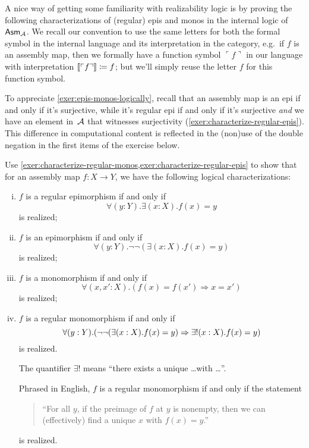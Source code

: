 A nice way of getting some familiarity with realizability logic is by proving
the following characterizations of (regular) epis and monos in the internal
logic of \(\Asm{\AA}\).
%
We recall our convention to use the same letters for both the formal symbol in
the internal language and its interpretation in the category, e.g.\ if \(f\) is
an assembly map, then we formally have a function symbol
\(\ulcorner f \urcorner\) in our language with interpretation
\(\sem{\ulcorner f \urcorner} \coloneqq f\); but we'll simply reuse the letter
\(f\) for this function symbol.

To appreciate \cref{exer:epis-monos-logically}, recall that an assembly map is
an epi if and only if it's surjective, while it's regular epi if and only if
it's surjective \emph{and} we have an element in~\(\AA\) that witnesses
surjectivity (\cref{exer:characterize-regular-epis}).
%
This difference in computational content is reflected in the (non)use of the
double negation in the first items of the exercise below.

\begin{exercise}\label{exer:epis-monos-logically}
  Use \cref{exer:characterize-regular-monos,exer:characterize-regular-epis} to
  show that for an assembly map \({f \colon X \to Y}\), we have the following
  logical characterizations:
  \begin{enumerate}[(i)]
  \item \(f\) is a regular epimorphism if and only if
    \[
      \forall(y : Y).\exists(x : X).f(x) = y
    \]
    is realized;
  \item \(f\) is an epimorphism if and only if
    \[
      \forall(y : Y).\lnot\lnot({\exists(x : X).f(x) = y})
    \]
    is realized;
  \item \(f\) is a monomorphism if and only if
    \[
      \forall(x, x' : X).(f(x) = f(x') \Rightarrow x = x')
    \]
    is realized;
  \item \(f\) is a regular monomorphism if and only if
    \[
      \forall(y : Y).\pa*{\lnot\lnot\pa*{\exists(x : X).f(x) = y} \Rightarrow \exists!(x : X).f(x) = y}
    \]
    is realized.

    The quantifier \(\exists!\) means ``there exists a unique \dots with \dots''.

    Phrased in English, \(f\) is a regular monomorphism if and only if the statement
    \begin{quote}{``For all \(y\), if the preimage of \(f\) at \(y\) is nonempty,
        then we can (effectively) find a unique \(x\) with \(f(x) = y\).''}
    \end{quote}
    is realized.
  \end{enumerate}
\end{exercise}


